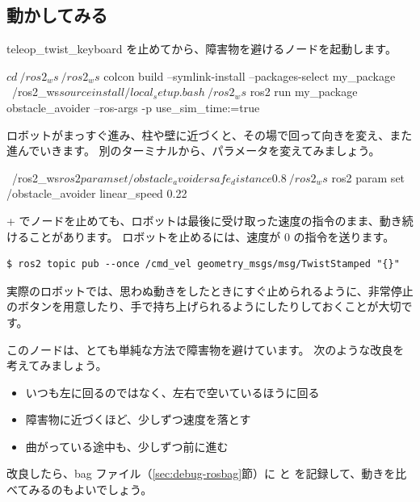 \subsection{動かしてみる}

teleop\_twist\_keyboard を止めてから、障害物を避けるノードを起動します。

\begin{terminal}[障害物を避けるノードを起動する]
$ cd ~/ros2_ws
~/ros2_ws$ colcon build --symlink-install --packages-select my_package
~/ros2_ws$ source install/local_setup.bash
~/ros2_ws$ ros2 run my_package obstacle_avoider --ros-args -p use_sim_time:=true
\end{terminal}

ロボットがまっすぐ進み、柱や壁に近づくと、その場で回って向きを変え、また進んでいきます。
別のターミナルから、パラメータを変えてみましょう。

\begin{terminal}[実行中にパラメータを変える]
~/ros2_ws$ ros2 param set /obstacle_avoider safe_distance 0.8
~/ros2_ws$ ros2 param set /obstacle_avoider linear_speed 0.22
\end{terminal}

\begin{caution}[ノードを止めてもロボットは止まらない]
  + でノードを止めても、ロボットは最後に受け取った速度の指令のまま、動き続けることがあります。
  ロボットを止めるには、速度が 0 の指令を送ります。
\begin{lstlisting}[numbers=none, xleftmargin=0pt, framexleftmargin=0pt]
$ ros2 topic pub --once /cmd_vel geometry_msgs/msg/TwistStamped "{}"
\end{lstlisting}
  実際のロボットでは、思わぬ動きをしたときにすぐ止められるように、非常停止のボタンを用意したり、手で持ち上げられるようにしたりしておくことが大切です。
\end{caution}

\begin{point}[改良してみよう]
  このノードは、とても単純な方法で障害物を避けています。
  次のような改良を考えてみましょう。
  \begin{itemize}
    \item いつも左に回るのではなく、左右で空いているほうに回る
    \item 障害物に近づくほど、少しずつ速度を落とす
    \item 曲がっている途中も、少しずつ前に進む
  \end{itemize}
  改良したら、bag ファイル（\ref{sec:debug-rosbag}節）に  と  を記録して、動きを比べてみるのもよいでしょう。
\end{point}

